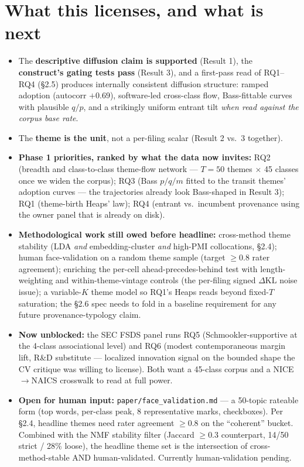 \documentclass[11pt]{report}
\begin{document}
\section{What this licenses, and what is next}
\begin{itemize}[nosep]
\item The \textbf{descriptive diffusion claim is supported} (Result 1), the
\textbf{construct's gating tests pass} (Result 3), and a first-pass read of
RQ1--RQ4 (§2.5) produces internally consistent diffusion structure: ramped
adoption (autocorr $+0.69$), software-led cross-class flow, Bass-fittable
curves with plausible $q/p$, and a strikingly uniform entrant tilt
\emph{when read against the corpus base rate}.
\item The \textbf{theme is the unit}, not a per-filing scalar (Result 2 vs.\ 3
together).
\item \textbf{Phase 1 priorities, ranked by what the data now invites:}
RQ2 (breadth and class-to-class theme-flow network --- $T=50$ themes
$\times$ 45 classes once we widen the corpus); RQ3 (Bass $p/q/m$ fitted to the
transit themes' adoption curves --- the trajectories already look Bass-shaped
in Result 3); RQ1 (theme-birth Heaps' law); RQ4 (entrant vs.\ incumbent
provenance using the owner panel that is already on disk).
\item \textbf{Methodological work still owed before headline:} cross-method
theme stability (LDA \emph{and} embedding-cluster \emph{and} high-PMI
collocations, §2.4); human face-validation on a random theme sample (target
$\geq 0.8$ rater agreement); enriching the per-cell ahead-precedes-behind test
with length-weighting and within-theme-vintage controls (the per-filing signed
$\Delta\mathrm{KL}$ noise issue); a variable-$K$ theme model so RQ1's Heaps
reads beyond fixed-$T$ saturation; the §2.6 spec needs to fold in a baseline
requirement for any future provenance-typology claim.
\item \textbf{Now unblocked:} the SEC FSDS panel runs RQ5 (Schmookler-supportive
at the 4-class associational level) and RQ6 (modest contemporaneous margin
lift, R\&D substitute --- localized innovation signal on the bounded shape
the CV critique was willing to license). Both want a 45-class corpus and a
NICE$\to$NAICS crosswalk to read at full power.
\item \textbf{Open for human input:} \texttt{paper/face\_validation.md} ---
a 50-topic rateable form (top words, per-class peak, 8 representative marks,
checkboxes). Per §2.4, headline themes need rater agreement $\geq 0.8$ on the
``coherent'' bucket. Combined with the NMF stability filter (Jaccard $\geq 0.3$
counterpart, 14/50 strict / 28\% loose), the headline theme set is the
intersection of cross-method-stable AND human-validated. Currently
human-validation pending.
\end{itemize}
\end{document}
